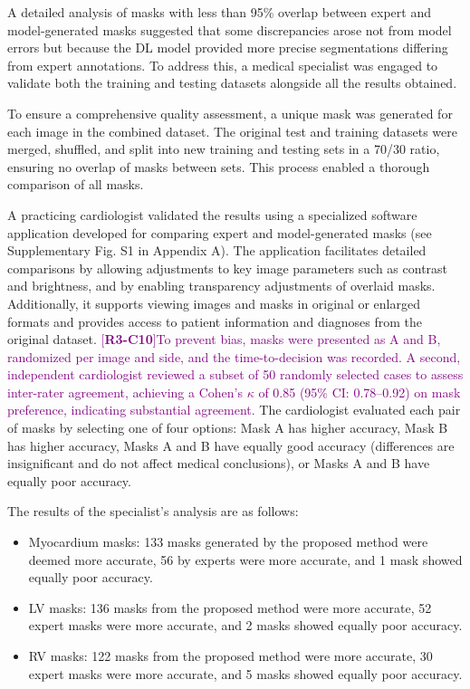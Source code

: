 \documentclass[fleqn,10pt]{wlscirep}
\newcommand{\revtag}[2]{[\textbf{R#1-C#2}]}
\newcommand{\Rthree}[1]{\textcolor{purple}{#1}}
\begin{document}
A detailed analysis of masks with less than 95\% overlap between expert and model-generated masks suggested that some discrepancies arose not from model errors but because the DL model provided more precise segmentations differing from expert annotations. To address this, a medical specialist was engaged to validate both the training and testing datasets alongside all the results obtained.

To ensure a comprehensive quality assessment, a unique mask was generated for each image in the combined dataset. The original test and training datasets were merged, shuffled, and split into new training and testing sets in a 70/30 ratio, ensuring no overlap of masks between sets. This process enabled a thorough comparison of all masks.

A practicing cardiologist validated the results using a specialized software application developed for comparing expert and model-generated masks (see Supplementary Fig. S1 in Appendix A). The application facilitates detailed comparisons by allowing adjustments to key image parameters such as contrast and brightness, and by enabling transparency adjustments of overlaid masks. Additionally, it supports viewing images and masks in original or enlarged formats and provides access to patient information and diagnoses from the original dataset. \Rthree{\revtag{3}{10}To prevent bias, masks were presented as A and B, randomized per image and side, and the time-to-decision was recorded. A second, independent cardiologist reviewed a subset of 50 randomly selected cases to assess inter-rater agreement, achieving a Cohen’s \(\kappa\) of 0.85 (95\% CI: 0.78–0.92) on mask preference, indicating substantial agreement.} The cardiologist evaluated each pair of masks by selecting one of four options: Mask A has higher accuracy, Mask B has higher accuracy, Masks A and B have equally good accuracy (differences are insignificant and do not affect medical conclusions), or Masks A and B have equally poor accuracy.

The results of the specialist’s analysis are as follows:

\begin{itemize}
    \item Myocardium masks: 133 masks generated by the proposed method were deemed more accurate, 56 by experts were more accurate, and 1 mask showed equally poor accuracy.
    \item LV masks: 136 masks from the proposed method were more accurate, 52 expert masks were more accurate, and 2 masks showed equally poor accuracy.
    \item RV masks: 122 masks from the proposed method were more accurate, 30 expert masks were more accurate, and 5 masks showed equally poor accuracy.
\end{itemize}
\end{document}
